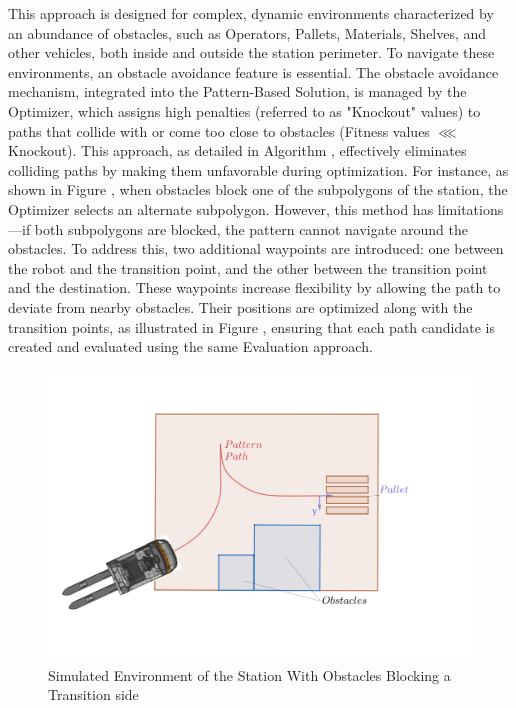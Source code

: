 This approach is designed for complex, dynamic environments characterized by an abundance of obstacles, such 
as Operators, Pallets, Materials, Shelves, and other vehicles, both inside and outside the station perimeter. 
To navigate these environments, an obstacle avoidance feature is essential. The obstacle avoidance mechanism, 
integrated into the Pattern-Based Solution, is managed by the Optimizer, which assigns high penalties 
(referred to as "Knockout" values) to paths that collide with or come too close to obstacles 
(Fitness values $\lll$ Knockout). This approach, as detailed in Algorithm , 
effectively eliminates colliding paths by making them unfavorable during optimization. For instance, 
as shown in Figure , when obstacles block one of the subpolygons of the station, the 
Optimizer selects an alternate subpolygon. However, this method has limitations—if both subpolygons 
are blocked, the pattern cannot navigate around the obstacles. To address this, two additional 
waypoints are introduced: one between the robot and the transition point, and the other between 
the transition point and the destination. These waypoints increase flexibility by allowing the path 
to deviate from nearby obstacles. Their positions are optimized along with the transition points, as 
illustrated in Figure , ensuring that each path candidate is created and evaluated 
using the same Evaluation approach.


\begin{figure}[H]
    \begin{center}
        \includegraphics[width=5in]{images/Chap2/Obstacles_In_Station.png} %
        \caption{Simulated Environment of the Station With Obstacles Blocking a Transition side}
        \label{Obstacle}
        \end{center}    
\end{figure}


